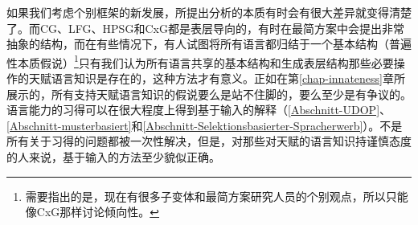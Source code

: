 如果我们考虑个别框架的新发展，所提出分析的本质有时会有很大差异就变得清楚了。而CG、LFG、HPSG和CxG都是表层导向的，有时在最简方案中会提出非常抽象的结构，而在有些情况下，有人试图将所有语言都归结于一个基本结构（普遍性本质假说）\footnote{%
需要指出的是，现在有很多子变体和最简方案研究人员的个别观点，所以只能像CxG那样讨论倾向性。
}只有我们认为所有语言共享的基本结构和生成表层结构那些必要操作的天赋语言知识是存在的，这种方法才有意义。正如在第\ref{chap-innateness}章所展示的，所有支持天赋语言知识的假说要么是站不住脚的，要么至少是有争议的。语言能力的习得可以在很大程度上得到基于输入的解释（\ref{Abschnitt-UDOP}、\ref{Abschnitt-musterbasiert}和\ref{Abschnitt-Selektionsbasierter-Spracherwerb}）。不是所有关于习得的问题都被一次性解决，但是，对那些对天赋的语言知识持谨慎态度的人来说，基于输入的方法至少貌似正确。

